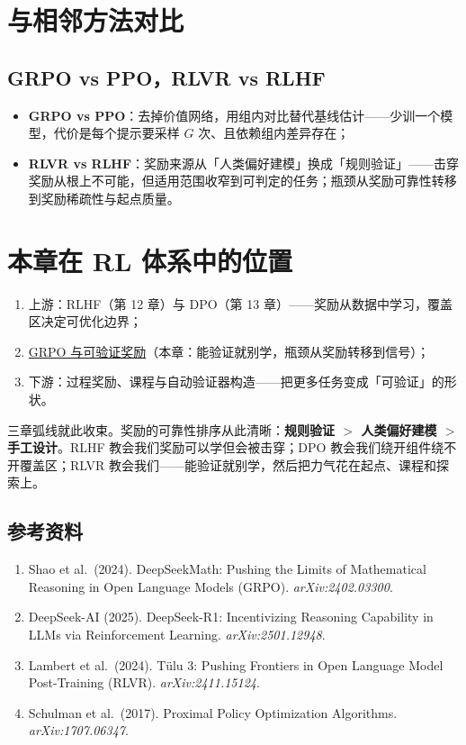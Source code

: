 \documentclass{article}
\begin{document}
\section*{与相邻方法对比}

\subsection*{GRPO vs PPO，RLVR vs RLHF}

\begin{itemize}
  \item \textbf{GRPO vs PPO}：去掉价值网络，用组内对比替代基线估计——少训一个模型，代价是每个提示要采样 $G$ 次、且依赖组内差异存在；
  \item \textbf{RLVR vs RLHF}：奖励来源从「人类偏好建模」换成「规则验证」——击穿奖励从根上不可能，但适用范围收窄到可判定的任务；瓶颈从奖励可靠性转移到奖励稀疏性与起点质量。
\end{itemize}

\section*{本章在 RL 体系中的位置}

\begin{enumerate}
  \item 上游：RLHF（第 12 章）与 DPO（第 13 章）——奖励从数据中学习，覆盖区决定可优化边界；
  \item \underline{GRPO 与可验证奖励}（本章：能验证就别学，瓶颈从奖励转移到信号）；
  \item 下游：过程奖励、课程与自动验证器构造——把更多任务变成「可验证」的形状。
\end{enumerate}

三章弧线就此收束。奖励的可靠性排序从此清晰：\textbf{规则验证 $>$ 人类偏好建模 $>$ 手工设计}。RLHF 教会我们奖励可以学但会被击穿；DPO 教会我们绕开组件绕不开覆盖区；RLVR 教会我们——能验证就别学，然后把力气花在起点、课程和探索上。

\subsection*{参考资料}

\begin{enumerate}
  \item Shao et al.\ (2024). DeepSeekMath: Pushing the Limits of Mathematical Reasoning in Open Language Models (GRPO). \textit{arXiv:2402.03300}.
  \item DeepSeek-AI (2025). DeepSeek-R1: Incentivizing Reasoning Capability in LLMs via Reinforcement Learning. \textit{arXiv:2501.12948}.
  \item Lambert et al.\ (2024). T\"ulu 3: Pushing Frontiers in Open Language Model Post-Training (RLVR). \textit{arXiv:2411.15124}.
  \item Schulman et al.\ (2017). Proximal Policy Optimization Algorithms. \textit{arXiv:1707.06347}.
\end{enumerate}
\end{document}
